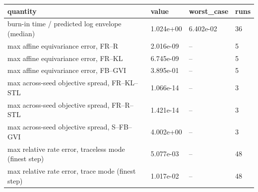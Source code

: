 \begin{tabular}{llll}
\toprule
quantity & value & worst\_case & runs \\
\midrule
burn-in time / predicted log envelope (median) & 1.024e+00 & 6.402e-02 & 36 \\
max affine equivariance error, FR--R & 2.016e-09 & -- & 5 \\
max affine equivariance error, FR--KL & 6.745e-09 & -- & 5 \\
max affine equivariance error, FB--GVI & 3.895e-01 & -- & 5 \\
max across-seed objective spread, FR--KL--STL & 1.066e-14 & -- & 3 \\
max across-seed objective spread, FR--R--STL & 1.421e-14 & -- & 3 \\
max across-seed objective spread, S--FB--GVI & 4.002e+00 & -- & 3 \\
max relative rate error, traceless mode (finest step) & 5.077e-03 & -- & 48 \\
max relative rate error, trace mode (finest step) & 1.017e-02 & -- & 48 \\
\bottomrule
\end{tabular}

